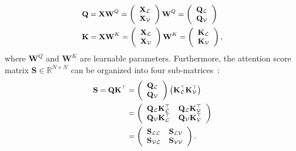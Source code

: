 \documentclass[11pt,a4paper]{article}
\begin{document}
\begin{equation}
\small
\begin{split}
    &\mathbf{Q}=\mathbf{X} \mathbf{W}^{Q}=\left(\begin{array}{l}
    \mathbf{X}_{\mathcal{L}} \\
    \mathbf{X}_{\mathcal{V}}
    \end{array}\right) \mathbf{W}^{Q}=\left(\begin{array}{l}
    \mathbf{Q}_{\mathcal{L}} \\
    \mathbf{Q}_{\mathcal{V}}
    \end{array}\right) \\
    &\mathbf{K}=\mathbf{X} \mathbf{W}^{K}=\left(\begin{array}{l}
    \mathbf{X}_{\mathcal{L}} \\
    \mathbf{X}_{\mathcal{V}}
    \end{array}\right) \mathbf{W}^{K}=\left(\begin{array}{l}
    \mathbf{K}_{\mathcal{L}} \\
    \mathbf{K}_{\mathcal{V}}
    \end{array}\right),
\end{split}
\end{equation}
where $\mathbf{W}^{Q}$ and $\mathbf{W}^{K}$ are learnable parameters. 
Furthermore, the attention score matrix $\mathbf{S} \in \mathbb{R}^{N \times N}$ can be organized into four sub-matrices~\cite{Multimodal-Pretraining-Unmasked}:
\begin{equation}
\small
    \begin{aligned}
    \mathbf{S}=\mathbf{Q} \mathbf{K}^{\top} &=\left(\begin{array}{c}
    \mathbf{Q}_{\mathcal{L}} \\
    \mathbf{Q}_{\mathcal{V}}
    \end{array}\right)\left(\mathbf{K}_{\mathcal{L}}^{\top} \mathbf{K}_{\mathcal{V}}^{\top}\right) \\
    &=\left(\begin{array}{ll}
    \mathbf{Q}_{\mathcal{L}} \mathbf{K}_{\mathcal{L}}^{\top} & \mathbf{Q}_{\mathcal{L}} \mathbf{K}_{\mathcal{V}}^{\top} \\
    \mathbf{Q}_{\mathcal{V}} \mathbf{K}_{\mathcal{L}}^{\top} & \mathbf{Q}_{\mathcal{V}} \mathbf{K}_{\mathcal{V}}^{\top}
    \end{array}\right) \\
    &=\left(\begin{array}{ll}
    \mathbf{S}_{\mathcal{LL}} & \mathbf{S}_{\mathcal{L} \mathcal{V}} \\
    \mathbf{S}_{\mathcal{V} \mathcal{L}} & \mathbf{S}_{\mathcal{VV}}
    \end{array}\right).
    \end{aligned}
    \label{equ:sub-matrices}
\end{equation}
\end{document}
